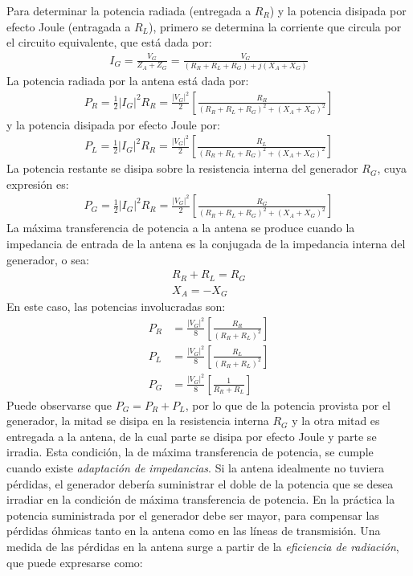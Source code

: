 Para determinar la potencia radiada (entregada a $R_R$) y la potencia disipada por efecto Joule (entragada a $R_L$), primero se determina la corriente que circula por el circuito equivalente, que  está dada por:
\begin{align}
I_G = \frac{V_G}{Z_A + Z_G} = \frac{V_G}{\left(R_R + R_L + R_G\right) + j\left(X_A + X_G\right)}
\label{ec_intro:36}
\end{align}
La potencia radiada por la antena está dada por:
\begin{align}
P_R = \frac{1}{2}\left|I_G\right|^2R_R = \frac{\left|V_G\right|^2}{2}\left[\frac{R_R}{\left(R_R + R_L + R_G\right)^2 + \left(X_A + X_G\right)^2}\right]
\label{ec_intro:37}
\end{align}
y la potencia disipada por efecto Joule por:
\begin{align}
P_L = \frac{1}{2}\left|I_G\right|^2R_R = \frac{\left|V_G\right|^2}{2}\left[\frac{R_L}{\left(R_R + R_L + R_G\right)^2 + \left(X_A + X_G\right)^2}\right]
\label{ec_intro:38}
\end{align}
La potencia restante se disipa sobre la resistencia interna del generador $R_G$, cuya expresión es:
\begin{align}
P_G = \frac{1}{2}\left|I_G\right|^2R_R = \frac{\left|V_G\right|^2}{2}\left[\frac{R_G}{\left(R_R + R_L + R_G\right)^2 + \left(X_A + X_G\right)^2}\right]
\label{ec_intro:39}
\end{align}
La máxima transferencia de potencia a la antena se produce cuando la impedancia de entrada de la antena es la conjugada de la impedancia interna del generador, o sea:
\begin{gather}
R_R + R_L = R_G
\label{ec_intro:40}\\
X_A = - X_G
\label{ec_intro:41}
\end{gather}
En este caso, las potencias involucradas son:
\begin{align}
P_R &= \frac{\left|V_G\right|^2}{8}\left[\frac{R_R}{\left(R_R + R_L\right)^2}\right]
\label{ec_intro:42}\\
P_L &= \frac{\left|V_G\right|^2}{8}\left[\frac{R_L}{\left(R_R + R_L\right)^2}\right]
\label{ec_intro:43}\\
P_G &= \frac{\left|V_G\right|^2}{8}\left[\frac{1}{R_R + R_L}\right]
\label{ec_intro:44}
\end{align}
Puede observarse que $P_G = P_R + P_L$, por lo que de la potencia provista por el generador, la mitad se disipa en la resistencia interna $R_G$ y la otra mitad es entregada a la antena, de la cual parte se disipa por efecto Joule y parte se irradia. Esta condición, la de máxima transferencia de potencia, se cumple cuando existe \emph{adaptación de impedancias}. Si la antena idealmente no tuviera pérdidas, el generador debería suministrar el doble de la potencia que se desea irradiar en la condición de máxima transferencia de potencia. En la práctica la potencia suministrada por el generador debe ser mayor, para compensar las pérdidas óhmicas tanto en la antena como en las líneas de transmisión. Una medida de las pérdidas en la antena surge a partir de la \emph{eficiencia de radiación}, que puede expresarse como:
